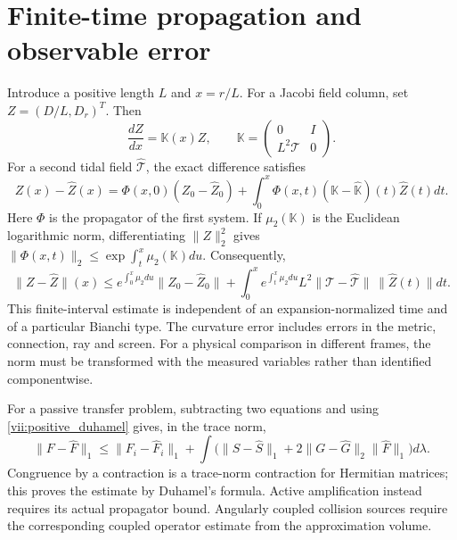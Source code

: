 \section{Finite-time propagation and observable error}
Introduce a positive length $L$ and $x=r/L$. For a Jacobi field column, set $Z=(D/L,D_r)^T$. Then
\begin{equation}\label{vii:jacobi_first_order}
\frac{dZ}{dx}=\mathbb K(x)Z,\qquad
\mathbb K=\begin{pmatrix}0&I\\L^2\mathcal T&0\end{pmatrix}.
\end{equation}
For a second tidal field $\widehat{\mathcal T}$, the exact difference satisfies
\begin{equation}\label{vii:jacobi_duhamel}
Z(x)-\widehat Z(x)=\Phi(x,0)(Z_0-\widehat Z_0)
+\int_0^x\Phi(x,t)(\mathbb K-\widehat{\mathbb K})(t)\widehat Z(t)dt.
\end{equation}
Here $\Phi$ is the propagator of the first system. If $\mu_2(\mathbb K)$ is the Euclidean logarithmic norm, differentiating $\|Z\|_2^2$ gives $\|\Phi(x,t)\|_2\le\exp\int_t^x\mu_2(\mathbb K)du$. Consequently,
\begin{equation}\label{vii:jacobi_error}
\|Z-\widehat Z\|(x)\le e^{\int_0^x\mu_2du}\|Z_0-\widehat Z_0\|
+\int_0^xe^{\int_t^x\mu_2du}L^2\|\mathcal T-\widehat{\mathcal T}\|\,\|\widehat Z(t)\|dt.
\end{equation}
This finite-interval estimate is independent of an expansion-normalized time and of a particular Bianchi type. The curvature error includes errors in the metric, connection, ray and screen. For a physical comparison in different frames, the norm must be transformed with the measured variables rather than identified componentwise.

For a passive transfer problem, subtracting two equations and using \eqref{vii:positive_duhamel} gives, in the trace norm,
\begin{equation}\label{vii:transfer_error}
\|F-\widehat F\|_1\le\|F_i-\widehat F_i\|_1+
\int\big(\|S-\widehat S\|_1+2\|G-\widehat G\|_2\|\widehat F\|_1\big)d\lambda.
\end{equation}
Congruence by a contraction is a trace-norm contraction for Hermitian matrices; this proves the estimate by Duhamel's formula. Active amplification instead requires its actual propagator bound. Angularly coupled collision sources require the corresponding coupled operator estimate from the approximation volume.

